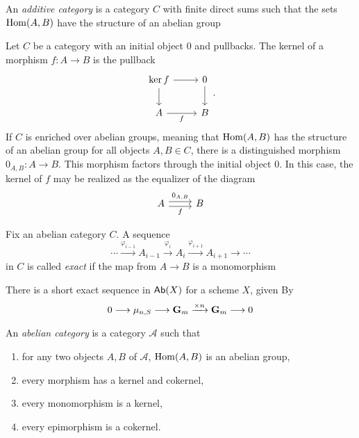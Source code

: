 \begin{definition}
	An \textit{additive category} is a category $C$ with finite direct sums such that the sets $\operatorname{Hom}(A,B)$ have the structure of an abelian group 
\end{definition}

\begin{definition}[Kernels]
	Let $C$ be a category with an initial object $0$ and pullbacks. The kernel of a morphism $f: A \to B$ is the pullback
	\[
		\begin{tikzcd}
			{\ker f} & 0 \\
			A & B
			\arrow[from=1-1, to=2-1]
			\arrow[from=1-1, to=1-2]
			\arrow["f"', from=2-1, to=2-2]
			\arrow[from=1-2, to=2-2]
		\end{tikzcd}.
	\]
	If $C$ is enriched over abelian groups, meaning that $\operatorname{Hom}(A,B)$ has the structure of an abelian group for all objects $A,B \in C$, there is a distinguished morphism $0_{A,B} : A \to B$. This morphism factors through the initial object $0$. In this case, the kernel of $f$ may be realized as the equalizer of the diagram
	\[
		\begin{tikzcd}
			A & B
			\arrow["f"', shift right=1, from=1-1, to=1-2]
			\arrow["{0_{A,B}}", shift left=1, from=1-1, to=1-2]
		\end{tikzcd}		
	\]
\end{definition}

\begin{definition}
	Fix an abelian category $C$.  A sequence 
	\[ \cdots \xrightarrow{\varphi_{i-1}} A_{i-1} \xrightarrow{\varphi_{i}} A_{i} \xrightarrow{\varphi_{i+1}} A_{i+1} \to \cdots\]
	in $C$ is called \textit{exact} if the map from $A \to B$ is a monomorphism
\end{definition}

\begin{example}
	There is a short exact sequence in $\mathsf{Ab}(X)$ for a scheme $X$, given By
	\[
		0 \longrightarrow \mu_{n,S} \longrightarrow \mathbf{G}_m \xrightarrow{\times n} \mathbf{G}_m \longrightarrow 0
	\]

\end{example}

\begin{remark}
	An \textit{abelian category} is a category $\mathcal{A}$ such that
	\begin{enumerate}
		\item for any two objects $A,B$ of $\mathcal{A}$, $\operatorname{Hom}(A,B)$ is an abelian group,
		\item every morphism has a kernel and cokernel,
		\item every monomorphism is a kernel,
		\item every epimorphism is a cokernel.
	\end{enumerate}
\end{remark}

